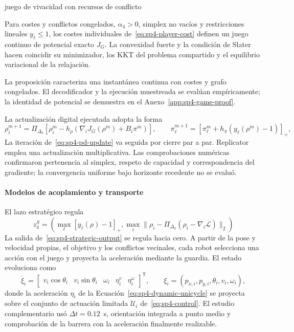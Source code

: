 \begin{contribucion}{juego de vivacidad con recursos de conflicto}
\begin{proposicion}
\label{prop:sp4-potential}
Para costes y conflictos congelados, $\alpha_4>0$, simplex no vacíos y restricciones lineales $y_\ell\leq1$, los costes individuales de~\eqref{eq:sp4-player-cost} definen un juego continuo de potencial exacto $J_G$. La convexidad fuerte y la condición de Slater hacen coincidir su minimizador, los KKT del problema compartido y el equilibrio variacional de la relajación.
\end{proposicion}
La proposición caracteriza una instantánea continua con costes y grafo congelados. El decodificador y la ejecución muestreada se evalúan empíricamente; la identidad de potencial se demuestra en el Anexo~\ref{app:sp4-game-proof}.
\end{contribucion}

La actualización digital ejecutada adopta la forma
\begin{equation}
\label{eq:sp4-pd-update}
\rho_i^{m+1}=\Pi_{\Delta_3}\!\left[\rho_i^m-h_\rho
  \left(\nabla_iJ_G(\rho^m)+B_i\pi^m\right)\right],\qquad
\pi_\ell^{m+1}=\left[\pi_\ell^m+h_\pi(y_\ell(\rho^m)-1)\right]_+,
\end{equation}
La iteración de~\eqref{eq:sp4-pd-update} va seguida por cierre par a par. Replicator emplea una actualización multiplicativa. Las comprobaciones numéricas confirmaron pertenencia al simplex, respeto de capacidad y correspondencia del gradiente; la convergencia uniforme bajo horizonte recedente no se evaluó.

\paragraph{Modelos de acoplamiento y transporte}

El lazo estratégico regula
\begin{equation}
\label{eq:sp4-strategic-output}
z_4^S=\left(\max_\ell[y_\ell(\rho)-1]_+,
\max_i\|\rho_i-\Pi_{\Delta_3}(\rho_i-\nabla_i\mathcal L)\|_2\right)
\end{equation}
La salida de~\eqref{eq:sp4-strategic-output} se regula hacia cero. A partir de la pose y velocidad propias, el objetivo y los conflictos vecinales, cada robot selecciona una acción con el juego y proyecta la aceleración mediante la guardia. El estado evoluciona como
\begin{equation}
 \dot\xi_i=
 \begin{bmatrix}
 v_i\cos\theta_i & v_i\sin\theta_i & \omega_i & \eta_i^v & \eta_i^\omega
 \end{bmatrix}^{\mathsf T},
 \qquad \xi_i=(p_{x,i},p_{y,i},\theta_i,v_i,\omega_i),
 \label{eq:sp4-dynamic-unicycle}
\end{equation}
donde la aceleración $\eta_i$ de la Ecuación~\eqref{eq:sp4-dynamic-unicycle} se
proyecta sobre el conjunto de actuación limitada $\mathcal U_i$ de~\eqref{eq:sp4-control}. El estudio complementario usó $\Delta t=0.12$~s, orientación integrada a punto medio y comprobación de la barrera con la aceleración finalmente realizable.

